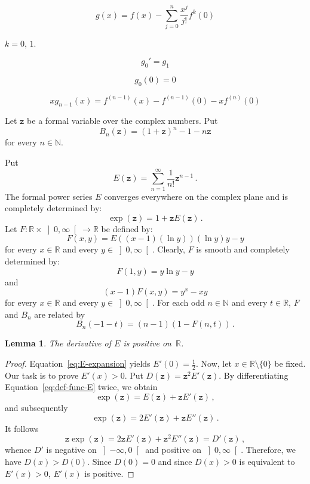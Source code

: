 \documentclass[12pt]{article}
\newcommand{\bR}{\mathbb{R}}
\newcommand{\bN}{\mathbb{N}}
\newcommand{\gtint}[1]{\left] #1, \infty \right[}
\newcommand{\ltint}[1]{\left]- \infty, #1 \right[}
\newcommand{\ttz}{\mathtt{z}}
\newtheorem{lemma}{Lemma}
\begin{document}
$$
g(x) = f(x) - \sum_{j = 0}^n \frac{x^j}{j!} f^{k}(0)
$$

$k = 0$, $1$.

$$
g_0' = g_1
$$

$$
g_0(0) = 0
$$

$$
xg_{n - 1}(x) = f^{(n - 1)}(x) - f^{(n - 1)}(0) - x f^{(n)}(0)
$$

Let $\ttz$ be a formal variable over the complex numbers.
Put
$$
B_n(\ttz) = {(1 + \ttz)}^n - 1 - n \ttz 
$$
for every $n \in \bN$.

Put
\begin{equation} \label{eq:E-expansion}
E(\ttz) = \sum_{n = 1}^\infty \frac{1}{n!} \ttz^{n - 1} \, .
\end{equation}
The formal power series $E$ converges everywhere on the complex plane and is completely determined by:
\begin{equation} \label{eq:def-func-E}
\exp(\ttz) = 1 + \ttz E(\ttz) \, . 
\end{equation} 
Let $F\colon \bR \times \gtint{0} \to \bR$ be defined by:
\begin{equation} \label{eq:def-F}
F(x, y) =  E((x - 1)( \ln y)) (\ln y) y  - y
\end{equation}
for every $x \in \bR$ and every $y \in \gtint{0}$.
Clearly, $F$ is smooth and completely determined by:
\begin{equation} \label{eq:F-y-lny-y}
F(1, y) = y \ln y - y
\end{equation}
and 
\begin{equation} \label{eq:F-yx-xy}
  (x - 1)F(x, y)  = y^x - x y
\end{equation}
for every $x \in \bR$ and every $y \in \gtint{0}$.
For each odd $n \in \bN$ and every $t \in \bR$, $F$ and $B_n$ are related by
\begin{equation} \label{eq:B-F}
B_n(- 1 - t) = (n - 1) (1 - F(n, t)) \, .
\end{equation} 

\begin{lemma} \label{lem:Eprime}
  The derivative of $E$ is positive on~$\bR$.
\end{lemma}

\begin{proof}
  Equation~\eqref{eq:E-expansion} yields $E'(0) = \frac{1}{2}$.
  Now, let  $x \in \bR \setminus \{ 0 \}$ be fixed.
  Our task is to prove $E'(x) > 0$.
  Put $D(\ttz) = \ttz^2 E'(\ttz)$. 
  By differentiating  Equation~\eqref{eq:def-func-E} twice, we obtain 
  $$
  \exp(\ttz) = E(\ttz) + \ttz E'(\ttz) \,, 
  $$
  and subsequently 
  $$
  \exp(\ttz) = 2 E'(\ttz) + \ttz E''(\ttz)  \,.
  $$
  It follows
  $$
  \ttz \exp(\ttz) = 2 \ttz E'(\ttz ) + \ttz^2 E''(\ttz) = D'(\ttz) \,,
  $$
  whence $D'$ is negative on $\ltint{0}$ and positive on $\gtint{0}$.
  Therefore, we have $D(x) > D(0)$.  
  Since $D(0) = 0$ and since $D(x) > 0$ is equivalent to $E'(x) > 0$,
  $E'(x)$ is positive.
\end{proof}
\end{document}
